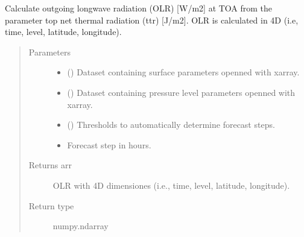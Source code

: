 \documentclass[a4paper,11pt,english]{sphinxmanual}
\begin{document}

\begin{fulllineitems}
\label{\detokenize{modules:envlib.processing_surf_vars.get_olr_4d}}
Calculate outgoing longwave radiation (OLR) {[}W/m2{]} at TOA from the parameter top net thermal radiation (ttr)
{[}J/m2{]}. OLR is calculated in 4D (i.e, time, level, latitude, longitude).
\begin{quote}\begin{description}
\item[{Parameters}] \leavevmode\begin{itemize}
\item {} 
 () \textendash{} Dataset containing surface parameters openned with xarray.

\item {} 
 () \textendash{} Dataset containing pressure level parameters openned with xarray.

\item {} 
 () \textendash{} Thresholds to automatically determine forecast steps.

\item {} 
 \textendash{} Forecast step in hours.

\end{itemize}

\item[{Returns arr}] \leavevmode
OLR with 4D dimensiones (i.e., time, level, latitude, longitude).

\item[{Return type}] \leavevmode
numpy.ndarray

\end{description}\end{quote}

\end{fulllineitems}
\end{document}
